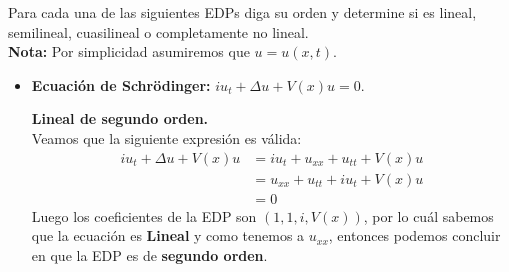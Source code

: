 \begin{homeworkProblem}
    Para cada una de las siguientes EDPs diga su orden y determine si es lineal, semilineal, cuasilineal o completamente no lineal.\\
    \textbf{Nota:} Por simplicidad asumiremos que $u=u(x,t)$.
\begin{itemize}
    \item  \textbf{Ecuación de Schrödinger:} $i u_t+\Delta u+V(x) u=0$.
    \begin{solucion}
        \textbf{Lineal de segundo orden.}\\
        Veamos que la siguiente expresión es válida:
        \begin{align*}
            iu_t+\Delta u+V(x)u&=iu_t+u_{xx}+u_{tt}+V(x)u\\
            &=u_{xx}+u_{tt}+iu_{t}+V(x)u\\
            &=0
        \end{align*}
        Luego los coeficientes de la EDP son $(1,1,i,V(x))$, por lo cuál sabemos que la ecuación es \textbf{Lineal} y como tenemos  a $u_{xx}$, entonces podemos concluir en que la EDP es de \textbf{segundo orden}. 
    \end{solucion}
    

\end{itemize}
\end{homeworkProblem}
